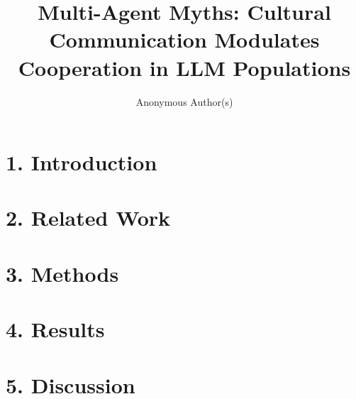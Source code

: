 \documentclass[sigconf,anonymous]{aamas}
\title{Multi-Agent Myths: Cultural Communication Modulates Cooperation in LLM Populations}
\author{Anonymous Author(s)}
\begin{document}
\maketitle
\section{1. Introduction}\label{introduction}

\section{2. Related Work}\label{background}

\section{3. Methods}\label{methods}

\section{4. Results}\label{results}

\section{5. Discussion}\label{discussion}

\clearpage %

\appendix

\end{document}
